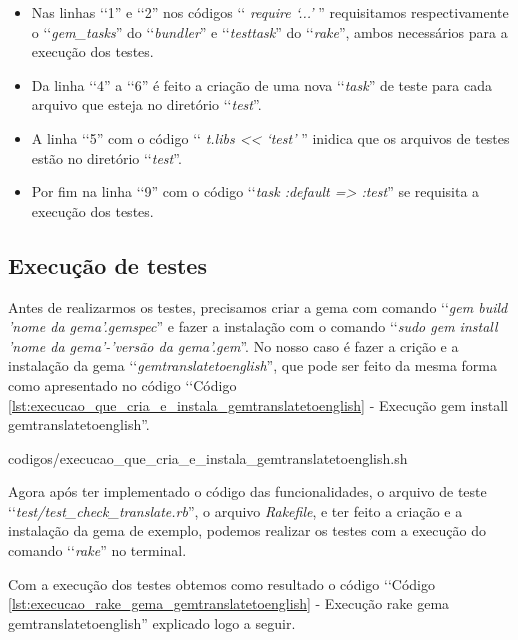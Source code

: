 \begin{itemize}

\item Nas linhas ‘‘1'' e ‘‘2'' nos códigos ‘‘ \emph{require ‘...'} '' requisitamos respectivamente o 
 ‘‘\emph{gem\_tasks}'' do ‘‘\emph{bundler}'' e ‘‘\emph{testtask}'' do ‘‘\emph{rake}'', ambos necessários para
 a execução dos testes.
 
 \item Da linha ‘‘4'' a ‘‘6'' é feito a criação de uma nova ‘‘\emph{task}'' de teste para cada arquivo 
 que esteja no diretório ‘‘\emph{test}''.
 
 \item A linha ‘‘5'' com o código ‘‘ \emph{t.libs << ‘test'} '' inidica que os arquivos de testes estão no 
 diretório ‘‘\emph{test}''.

 \item Por fim na linha ‘‘9'' com o código ‘‘\emph{task :default => :test}'' se requisita a execução 
 dos testes.
 
\end{itemize}

\subsection{Execução de testes}
\label{subsection:execução_de_testes}

Antes de realizarmos os testes, precisamos criar a gema com comando ‘‘\emph{gem build 'nome da gema'.gemspec}'' 
e fazer a instalação com o comando ‘‘\emph{sudo gem install 'nome da gema'-'versão da gema'.gem}''. No nosso 
caso é fazer a crição e a instalação da gema ‘‘\emph{gemtranslatetoenglish}'', que pode ser feito da mesma 
forma como apresentado no código ‘‘Código \ref{lst:execucao_que_cria_e_instala_gemtranslatetoenglish} - Execução 
gem install gemtranslatetoenglish''.


{codigos/execucao_que_cria_e_instala_gemtranslatetoenglish.sh }

Agora após ter implementado o código das funcionalidades, o arquivo de teste 
‘‘\emph{test/test\_check\_translate.rb}'', o arquivo \emph{Rakefile}, e ter feito a criação e a instalação 
da gema de exemplo, podemos realizar os testes com a execução do comando ‘‘\emph{rake}'' no terminal. 

Com a execução dos testes obtemos como resultado o código ‘‘Código 
\ref{lst:execucao_rake_gema_gemtranslatetoenglish} - Execução rake gema gemtranslatetoenglish'' explicado 
logo a seguir.

